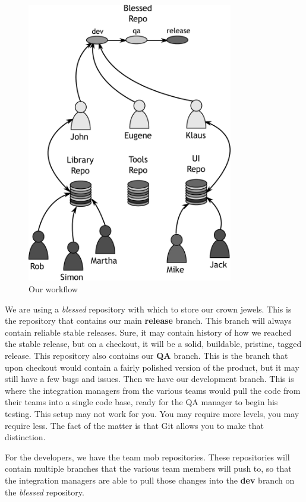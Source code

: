\begin{figure}[hbt]
\centering
\includegraphics[width=9cm]{images/f-w7-d1.pdf}
\caption{Our workflow}
\end{figure}

We are using a \emph{blessed} repository with which to store our crown jewels.  This is the repository that contains our main \textbf{release} branch.  This branch will always contain reliable stable releases.  Sure, it may contain history of how we reached the stable release, but on a checkout, it will be a solid, buildable, pristine, tagged release.  This repository also contains our \textbf{QA} branch.  This is the branch that upon checkout would contain a fairly polished version of the product, but it may still have a few bugs and issues.  Then we have our development branch.  This is where the integration managers from the various teams would pull the code from their teams into a single code base, ready for the QA manager to begin his testing.  This setup may not work for you.  You may require more levels, you may require less.  The fact of the matter is that Git allows you to make that distinction.  

For the developers, we have the team mob repositories.  These repositories will contain multiple branches that the various team members will push to, so that the integration managers are able to pull those changes into the \textbf{dev} branch on the \emph{blessed} repository.

